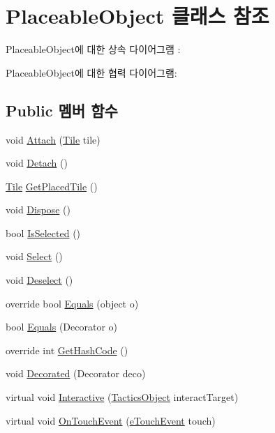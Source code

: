 \hypertarget{class_placeable_object}{}\section{Placeable\+Object 클래스 참조}
\label{class_placeable_object}


Placeable\+Object에 대한 상속 다이어그램 \+: 


Placeable\+Object에 대한 협력 다이어그램\+:
\subsection*{Public 멤버 함수}
\begin{DoxyCompactItemize}
\item 
void \hyperlink{class_placeable_object_a3176ec3d5d26b2a83cdc58b01e630aa1}{Attach} (\hyperlink{class_tile}{Tile} tile)
\item 
void \hyperlink{class_placeable_object_aef2018b58bf7c8c0fab5aaf3d9a154d4}{Detach} ()
\item 
\hyperlink{class_tile}{Tile} \hyperlink{class_placeable_object_ab44a9b122632ac3cf0babb5040e8a201}{Get\+Placed\+Tile} ()
\item 
void \hyperlink{class_placeable_object_a8bd49b7db556556502a0518fc833be48}{Dispose} ()
\item 
bool \hyperlink{class_placeable_object_a71fd42914caa0dc6229fe6a5ffe09b99}{Is\+Selected} ()
\item 
void \hyperlink{class_placeable_object_a019818f3f6c6eb715fed163efa921f5a}{Select} ()
\item 
void \hyperlink{class_placeable_object_a0c1248b1f9981ddbf68e6f70a6498f3d}{Deselect} ()
\item 
override bool \hyperlink{class_m_c_n_1_1_deco_instance_ac327fa53871e183c0e46ac9c66ba00bc}{Equals} (object o)
\item 
bool \hyperlink{class_m_c_n_1_1_deco_instance_a179363468337afa0d1401ff9da1813f0}{Equals} (Decorator o)
\item 
override int \hyperlink{class_m_c_n_1_1_deco_instance_ab8768bdf4ece9568cc120411c286bfb5}{Get\+Hash\+Code} ()
\item 
void \hyperlink{class_m_c_n_1_1_deco_instance_af6c8520c7bb40840651026e3693afcb4}{Decorated} (Decorator deco)
\item 
virtual void \hyperlink{class_tactics_object_a5f94ed01497a7072a2785163f4cbc57b}{Interactive} (\hyperlink{class_tactics_object}{Tactics\+Object} interact\+Target)
\item 
virtual void \hyperlink{class_tactics_object_a0353d47981c71db7fe32bd414f025e9b}{On\+Touch\+Event} (\hyperlink{_touch_manager_8cs_ae33e321a424fe84ba8b2fdb81ad40a68}{e\+Touch\+Event} touch)
\end{DoxyCompactItemize}
